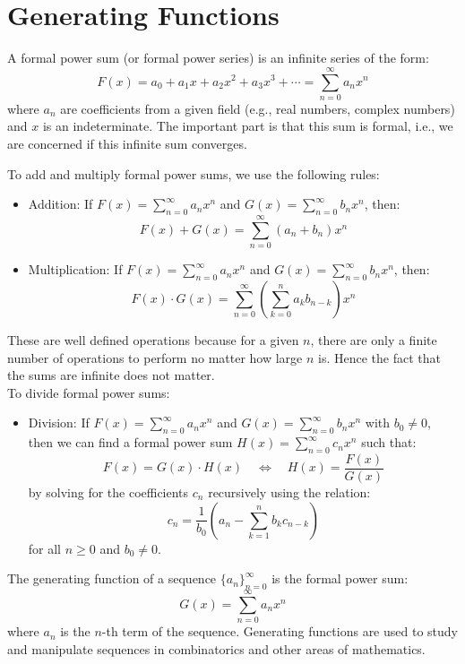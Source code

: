 \section{Generating Functions}
\begin{definition}
    A formal power sum (or formal power series) is an infinite series of the form:
    \[ F(x) = a_0 + a_1 x + a_2 x^2 + a_3 x^3 + \cdots = \sum_{n=0}^{\infty} a_n x^n \]
    where $a_n$ are coefficients from a given field (e.g., real numbers, complex numbers) and $x$ is an indeterminate. The important part is that this sum is formal, i.e., we are concerned if this infinite sum converges.
\end{definition}
To add and multiply formal power sums, we use the following rules:
\begin{itemize}[itemsep=1pt,label=$\circ$]
    \item Addition: If $F(x) = \sum_{n=0}^{\infty} a_n x^n$ and $G(x) = \sum_{n=0}^{\infty} b_n x^n$, then:
    \[ F(x) + G(x) = \sum_{n=0}^{\infty} (a_n + b_n) x^n \]
    \item Multiplication: If $F(x) = \sum_{n=0}^{\infty} a_n x^n$ and $G(x) = \sum_{n=0}^{\infty} b_n x^n$, then:
    \[ F(x) \cdot G(x) = \sum_{n=0}^{\infty} \left( \sum_{k=0}^{n} a_k b_{n-k} \right) x^n \]
\end{itemize}
These are well defined operations because for a given $n$, there are only a finite number of operations to perform no matter how large $n$ is. Hence the fact that the sums are infinite does not matter. \\
To divide formal power sums:
\begin{itemize}[itemsep=1pt,label=$\circ$]
    \item Division: If $F(x) = \sum_{n=0}^{\infty} a_n x^n$ and $G(x) = \sum_{n=0}^{\infty} b_n x^n$ with $b_0 \neq 0$, then we can find a formal power sum $H(x) = \sum_{n=0}^{\infty} c_n x^n$ such that:
    \[ F(x) = G(x) \cdot H(x) \quad \Leftrightarrow \quad H(x) = \frac{F(x)}{G(x)} \]
    by solving for the coefficients $c_n$ recursively using the relation:
    \[ c_n = \frac{1}{b_0} \left( a_n - \sum_{k=1}^{n} b_k c_{n-k} \right) \]
    for all $n \geq 0$ and $b_0 \neq 0$.
\end{itemize}

\begin{definition}
    The generating function of a sequence $\{a_n\}_{n=0}^{\infty}$ is the formal power sum:
    \[ G(x) = \sum_{n=0}^{\infty} a_n x^n \]
    where $a_n$ is the $n$-th term of the sequence. Generating functions are used to study and manipulate sequences in combinatorics and other areas of mathematics.
\end{definition}

